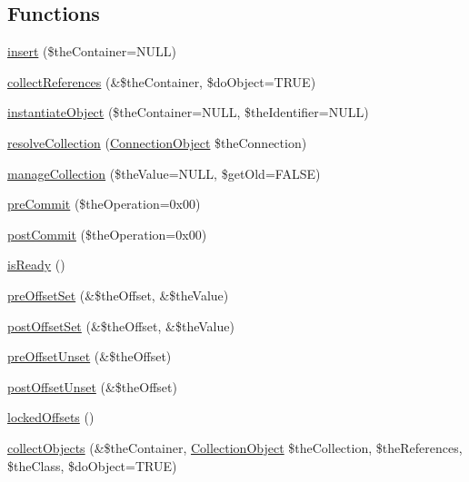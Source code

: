 \subsection*{Functions}
\begin{DoxyCompactItemize}
\item 
\hyperlink{namespace_ontology_wrapper_ab77fac8090f8a8d01085079e3b051453}{insert} (\$the\-Container=N\-U\-L\-L)
\item 
\hyperlink{namespace_ontology_wrapper_a918d780d580b39b1910d1bdcde4ba962}{collect\-References} (\&\$the\-Container, \$do\-Object=T\-R\-U\-E)
\item 
\hyperlink{namespace_ontology_wrapper_ae6754181b2df357062755fcfe794a8b4}{instantiate\-Object} (\$the\-Container=N\-U\-L\-L, \$the\-Identifier=N\-U\-L\-L)
\item 
\hyperlink{namespace_ontology_wrapper_af0bd5641d070a9d9e60473b0b18eb816}{resolve\-Collection} (\hyperlink{class_ontology_wrapper_1_1_connection_object}{Connection\-Object} \$the\-Connection)
\item 
\hyperlink{namespace_ontology_wrapper_acfd845f5f446b25ee01543043b5494fd}{manage\-Collection} (\$the\-Value=N\-U\-L\-L, \$get\-Old=F\-A\-L\-S\-E)
\item 
\hyperlink{namespace_ontology_wrapper_a5980c6068634a59d6fbd56e0767d111b}{pre\-Commit} (\$the\-Operation=0x00)
\item 
\hyperlink{namespace_ontology_wrapper_a402131d10c18417ee42fd66589796fdf}{post\-Commit} (\$the\-Operation=0x00)
\item 
\hyperlink{namespace_ontology_wrapper_a54350c9fd625965326da65246d145282}{is\-Ready} ()
\item 
\hyperlink{namespace_ontology_wrapper_a348b5e4ddf6bbaf490dce39f02491e71}{pre\-Offset\-Set} (\&\$the\-Offset, \&\$the\-Value)
\item 
\hyperlink{namespace_ontology_wrapper_aa802ae82d774fdd1893b7716bb9acbf6}{post\-Offset\-Set} (\&\$the\-Offset, \&\$the\-Value)
\item 
\hyperlink{namespace_ontology_wrapper_a110e22a06912c47b56eef18c4c5bbf8f}{pre\-Offset\-Unset} (\&\$the\-Offset)
\item 
\hyperlink{namespace_ontology_wrapper_a292bd5a0f4072f4c22b7f8ece9f3cc14}{post\-Offset\-Unset} (\&\$the\-Offset)
\item 
\hyperlink{namespace_ontology_wrapper_accb23ff544361b7ae4c9c3fc3422e875}{locked\-Offsets} ()
\item 
\hyperlink{namespace_ontology_wrapper_af1e0f4bf0ea13a70be89b2254b41ce3e}{collect\-Objects} (\&\$the\-Container, \hyperlink{class_ontology_wrapper_1_1_collection_object}{Collection\-Object} \$the\-Collection, \$the\-References, \$the\-Class, \$do\-Object=T\-R\-U\-E)

\end{DoxyCompactItemize}
